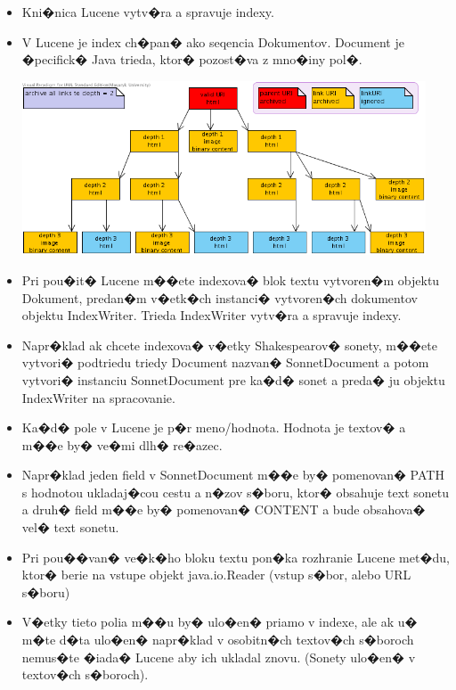 \documentclass[11pt,a4paper]{article}
\begin{document}
\begin{itemize}
\item Kni�nica Lucene vytv�ra a spravuje indexy.
\item V Lucene je index ch�pan� ako seqencia Dokumentov. Document je �pecifick� Java trieda, ktor� pozost�va z mno�iny pol�.

\includegraphics[width=120mm]{depth.png}

\item Pri pou�it� Lucene m��ete indexova� blok textu vytvoren�m objektu Dokument, predan�m v�etk�ch instanci� vytvoren�ch dokumentov objektu
IndexWriter. Trieda IndexWriter vytv�ra a spravuje indexy.
\item Napr�klad ak chcete indexova� v�etky Shakespearov� sonety, m��ete vytvori� podtriedu triedy Document nazvan� SonnetDocument a potom vytvori� instanciu SonnetDocument pre ka�d� sonet a preda� ju objektu IndexWriter na spracovanie.
\item Ka�d� pole v Lucene je p�r meno/hodnota. Hodnota je textov� a m��e by� ve�mi dlh� re�azec. 
\item Napr�klad jeden field v SonnetDocument m��e by� pomenovan� PATH s hodnotou ukladaj�cou cestu a n�zov s�boru, ktor� obsahuje text sonetu a druh� field m��e by� pomenovan� CONTENT a bude obsahova� vel� text sonetu.
\item Pri pou��van� ve�k�ho bloku textu pon�ka rozhranie Lucene met�du, ktor� berie na vstupe objekt java.io.Reader (vstup s�bor, alebo URL s�boru)
\item V�etky tieto polia m��u by� ulo�en� priamo v indexe, ale ak u� m�te d�ta ulo�en� napr�klad v osobitn�ch textov�ch s�boroch nemus�te �iada� Lucene aby ich ukladal znovu. (Sonety ulo�en� v textov�ch s�boroch).
\end{itemize}
\end{document}
